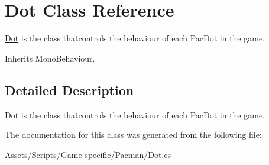 \hypertarget{class_dot}{\section{Dot Class Reference}
\label{class_dot}
}


\hyperlink{class_dot}{Dot} is the class thatcontrols the behaviour of each Pac\-Dot in the game.  




Inherits Mono\-Behaviour.



\subsection{Detailed Description}
\hyperlink{class_dot}{Dot} is the class thatcontrols the behaviour of each Pac\-Dot in the game. 



The documentation for this class was generated from the following file\-:\begin{DoxyCompactItemize}
\item 
Assets/\-Scripts/\-Game specific/\-Pacman/Dot.\-cs\end{DoxyCompactItemize}
